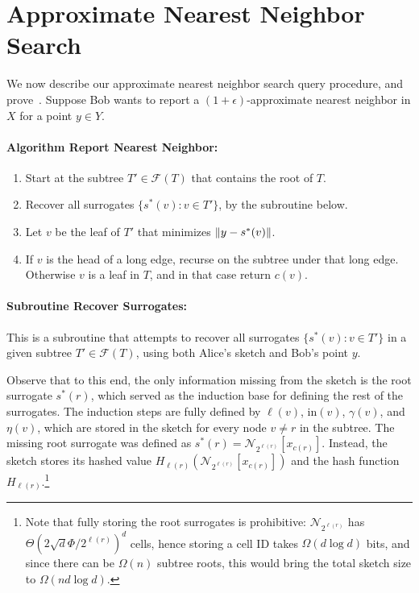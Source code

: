 \section{Approximate Nearest Neighbor Search}\label{sec:ann}

We now describe our approximate nearest neighbor search query procedure, and prove~.
Suppose Bob wants to report a $(1+\epsilon)$-approximate nearest neighbor in $X$ for a point $y\in Y$.

\paragraph{Algorithm Report Nearest Neighbor:}
\begin{enumerate}
  \item Start at the subtree $T'\in\mathcal F(T)$ that contains the root of $T$.
  \item Recover all surrogates $\{s^*(v):v\in T'\}$, by the subroutine below.
  \item Let $v$ be the leaf of $T'$ that minimizes $\lVert y-s^*(v)\rVert$.
  \item If $v$ is the head of a long edge, recurse on the subtree under that long edge. Otherwise $v$ is a leaf in $T$, and in that case return $c(v)$.
\end{enumerate}

\paragraph{Subroutine Recover Surrogates:}
This is a subroutine that attempts to recover all surrogates $\{s^*(v):v\in T'\}$ in a given subtree $T'\in\mathcal F(T)$, using both Alice's sketch and Bob's point $y$.

Observe that to this end, the only information missing from the sketch is the root surrogate $s^*(r)$, which served as the induction base for defining the rest of the surrogates. The induction steps are fully defined by $\ell(v)$, $\mathrm{in}(v)$, $\gamma(v)$, and $\eta(v)$, which are stored in the sketch for every node $v\neq r$ in the subtree.
The missing root surrogate was defined as $s^*(r)=\mathcal N_{2^{\ell(r)}}[x_{c(r)}]$.
Instead, the sketch stores its hashed value $H_{\ell(r)}(\mathcal N_{2^{\ell(r)}}[x_{c(r)}])$ and the hash function $H_{\ell(r)}$.\footnote{Note that fully storing the root surrogates is prohibitive: $\mathcal N_{2^{\ell(r)}}$ has $\Theta(2\sqrt{d}\Phi/2^{\ell(r)})^d$ cells, hence storing a cell ID takes $\Omega(d\log d)$ bits, and since there can be $\Omega(n)$ subtree roots, this would bring the total sketch size to $\Omega(nd\log d)$.}


